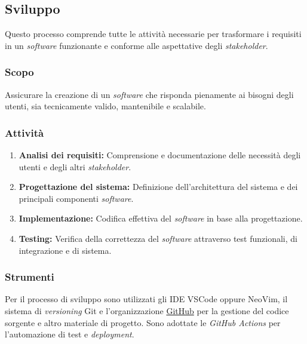\subsection{Sviluppo}

Questo processo comprende tutte le attività necessarie per trasformare i
requisiti in un \textit{software} funzionante e conforme alle aspettative degli
\textit{stakeholder}.

\subsubsection{Scopo}
Assicurare la creazione di un \textit{software} che risponda pienamente ai
bisogni degli utenti, sia tecnicamente valido, mantenibile e scalabile.

\subsubsection{Attività}
\begin{enumerate}
	\item \textbf{Analisi dei requisiti:} Comprensione e documentazione delle
	      necessità degli utenti e degli altri \textit{stakeholder}.
	\item \textbf{Progettazione del sistema:} Definizione dell'architettura del
	      sistema e dei principali componenti \textit{software}.
	\item \textbf{Implementazione:} Codifica effettiva del \textit{software} in
	      base alla progettazione.
	\item \textbf{Testing:} Verifica della correttezza del \textit{software}
	      attraverso test funzionali, di integrazione e di sistema.
\end{enumerate}

\subsubsection{Strumenti}
Per il processo di sviluppo sono utilizzati gli IDE VSCode oppure NeoVim, il
sistema di \textit{versioning} Git e l'organizzazione
\href{https://github.com/Project-SWEnergy}{GitHub} per la gestione del codice
sorgente e altro materiale di progetto. Sono adottate le \textit{GitHub Actions}
per l'automazione di test e \textit{deployment}.
